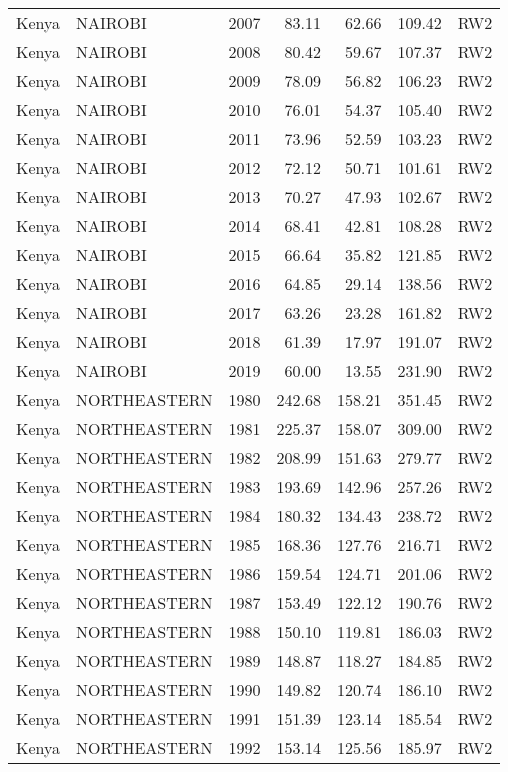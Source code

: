 \begin{longtable}{lllrrrl}
  Kenya & NAIROBI & 2007 & 83.11 & 62.66 & 109.42 & RW2 \\ 
  Kenya & NAIROBI & 2008 & 80.42 & 59.67 & 107.37 & RW2 \\ 
  Kenya & NAIROBI & 2009 & 78.09 & 56.82 & 106.23 & RW2 \\ 
  Kenya & NAIROBI & 2010 & 76.01 & 54.37 & 105.40 & RW2 \\ 
  Kenya & NAIROBI & 2011 & 73.96 & 52.59 & 103.23 & RW2 \\ 
  Kenya & NAIROBI & 2012 & 72.12 & 50.71 & 101.61 & RW2 \\ 
  Kenya & NAIROBI & 2013 & 70.27 & 47.93 & 102.67 & RW2 \\ 
  Kenya & NAIROBI & 2014 & 68.41 & 42.81 & 108.28 & RW2 \\ 
  Kenya & NAIROBI & 2015 & 66.64 & 35.82 & 121.85 & RW2 \\ 
  Kenya & NAIROBI & 2016 & 64.85 & 29.14 & 138.56 & RW2 \\ 
  Kenya & NAIROBI & 2017 & 63.26 & 23.28 & 161.82 & RW2 \\ 
  Kenya & NAIROBI & 2018 & 61.39 & 17.97 & 191.07 & RW2 \\ 
  Kenya & NAIROBI & 2019 & 60.00 & 13.55 & 231.90 & RW2 \\ 
  Kenya & NORTHEASTERN & 1980 & 242.68 & 158.21 & 351.45 & RW2 \\ 
  Kenya & NORTHEASTERN & 1981 & 225.37 & 158.07 & 309.00 & RW2 \\ 
  Kenya & NORTHEASTERN & 1982 & 208.99 & 151.63 & 279.77 & RW2 \\ 
  Kenya & NORTHEASTERN & 1983 & 193.69 & 142.96 & 257.26 & RW2 \\ 
  Kenya & NORTHEASTERN & 1984 & 180.32 & 134.43 & 238.72 & RW2 \\ 
  Kenya & NORTHEASTERN & 1985 & 168.36 & 127.76 & 216.71 & RW2 \\ 
  Kenya & NORTHEASTERN & 1986 & 159.54 & 124.71 & 201.06 & RW2 \\ 
  Kenya & NORTHEASTERN & 1987 & 153.49 & 122.12 & 190.76 & RW2 \\ 
  Kenya & NORTHEASTERN & 1988 & 150.10 & 119.81 & 186.03 & RW2 \\ 
  Kenya & NORTHEASTERN & 1989 & 148.87 & 118.27 & 184.85 & RW2 \\ 
  Kenya & NORTHEASTERN & 1990 & 149.82 & 120.74 & 186.10 & RW2 \\ 
  Kenya & NORTHEASTERN & 1991 & 151.39 & 123.14 & 185.54 & RW2 \\ 
  Kenya & NORTHEASTERN & 1992 & 153.14 & 125.56 & 185.97 & RW2 \\ 

\end{longtable}
